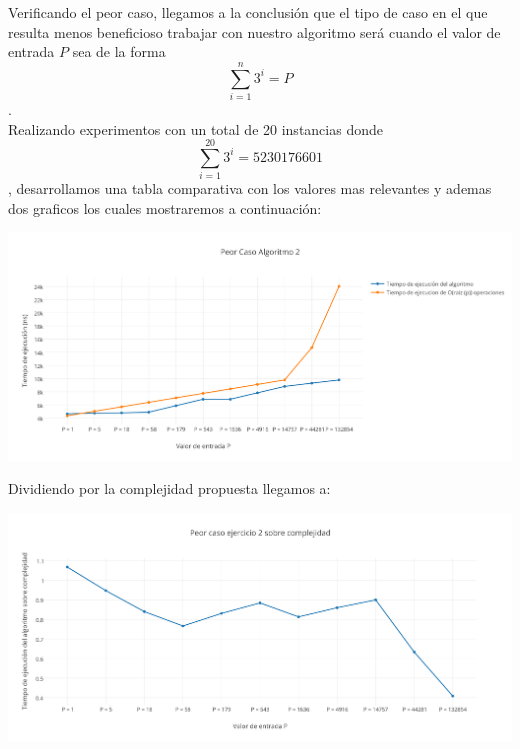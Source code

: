 Verificando el peor caso, llegamos a la conclusi\'on que el tipo de caso en el que resulta menos beneficioso trabajar con nuestro algoritmo ser\'a cuando el valor de entrada $P$ sea de la forma \[
\sum_{i=1}^{n}3^{i}=P 
\].
\\

Realizando experimentos con un total de 20 instancias donde \[
\sum_{i=1}^{20}3^{i}=5230176601 
\], desarrollamos una tabla comparativa con los valores mas relevantes y ademas dos graficos los cuales mostraremos a continuaci\'on: \\

\vspace*{0.3cm} \vspace*{0.3cm}
  \begin{center}
 \includegraphics[scale=0.6]{./EJ2/peorcaso.png}
  \end{center}
  \vspace*{0.3cm}


Dividiendo por la complejidad propuesta llegamos a:\\

\vspace*{0.3cm} \vspace*{0.3cm}
  \begin{center}
 \includegraphics[scale=0.6]{./EJ2/peorcaso2.png}
  \end{center}
  \vspace*{0.3cm}

